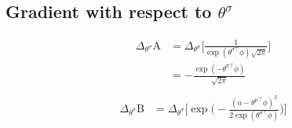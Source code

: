 \documentclass{article}
\begin{document}
\subsection{Gradient with respect to $\theta^\sigma$}
\begin{align*}
\Delta_{\theta^\sigma} \text{A} &= \Delta_{\theta^\sigma} \bigg[\frac{1}{\exp(\theta^
	{\sigma\top}\phi)\sqrt{2\pi}}\bigg]\\
&=  -\frac{\exp(-\theta^
	{\sigma\top}\phi)}{\sqrt{2\pi}}\\
\end{align*}
\begin{align*}
\Delta_{\theta^\sigma} \text{B} &= \Delta_{\theta^\sigma} \bigg[ \exp\bigg(- \frac{(a - \theta^{\mu\top}\phi)^2}{2\exp(\theta^{\sigma\top}\phi)}\bigg)\bigg]\\
\end{align*}




	
\end{document}
